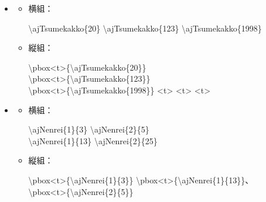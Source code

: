 \documentclass[uplatex, dvipdfmx, paper=a4paper, line_length=45zw, head_space=7zw, foot_space=10zw]{jlreq}
\begin{document}
\begin{itemize}
  \item {}
  \begin{itemize}
    \item {\small\sffamily\gtfamily 横組：}
      \begin{demosource}[0.25]
        {\textbackslash}ajTsumekakko\{20\}%
        {\textbackslash}ajTsumekakko\{123\}%
        {\textbackslash}ajTsumekakko\{1998\}%
        \tcblower
        \ibmfamily
      \end{demosource}
    \item {\small\sffamily\gtfamily 縦組：}
      \begin{demosource}[0.25]
        {\textbackslash}pbox<t>\{{\textbackslash}ajTsumekakko\{20\}\}\\
        {\textbackslash}pbox<t>\{{\textbackslash}ajTsumekakko\{123\}\}\\
        {\textbackslash}pbox<t>\{{\textbackslash}ajTsumekakko\{1998\}\}
        \tcblower
        \ibmfamily
        \pbox<t>{}
        \pbox<t>{}
        \pbox<t>{}
      \end{demosource}
  \end{itemize}
  \item {}
    \begin{itemize}
      \item {\small\sffamily\gtfamily 横組：}
        \begin{demosource}[0.25]
          {\textbackslash}ajNenrei\{1\}\{3\}%
          {\textbackslash}ajNenrei\{2\}\{5\}\\%
          {\textbackslash}ajNenrei\{1\}\{13\}%
          {\textbackslash}ajNenrei\{2\}\{25\}%
          \tcblower
          \ibmfamily
        \end{demosource}
      \item {\small\sffamily\gtfamily 縦組：}
        \begin{demosource}[0.25]
          {\textbackslash}pbox<t>\{{\textbackslash}ajNenrei\{1\}\{3\}\}%
          {\textbackslash}pbox<t>\{{\textbackslash}ajNenrei\{1\}\{13\}\}、\\%
          {\textbackslash}pbox<t>\{{\textbackslash}ajNenrei\{2\}\{5\}\}%

\end{demosource}
\end{itemize}
\end{itemize}
\end{document}
